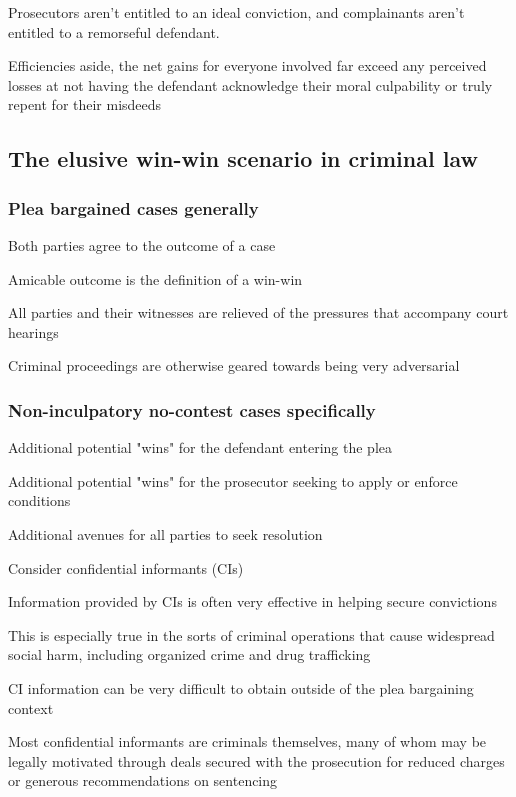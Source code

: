 Prosecutors aren't entitled to an ideal conviction, and complainants aren't entitled to a remorseful defendant. 

Efficiencies aside, the net gains for everyone involved far exceed any perceived losses at not having the defendant acknowledge their moral culpability or truly repent for their misdeeds

\subsection{The elusive win-win scenario in criminal law}

\subsubsection{Plea bargained cases generally}

Both parties agree to the outcome of a case

Amicable outcome is the definition of a win-win

All parties and their witnesses are relieved of the pressures that accompany court hearings

Criminal proceedings are otherwise geared towards being very adversarial

\subsubsection{Non-inculpatory no-contest cases specifically}

Additional potential "wins" for the defendant entering the plea

Additional potential "wins" for the prosecutor seeking to apply or enforce conditions

Additional avenues for all parties to seek resolution

Consider confidential informants (CIs)

Information provided by CIs is often very effective in helping secure convictions

This is especially true in the sorts of criminal operations that cause widespread social harm, including organized crime and drug trafficking

CI information can be very difficult to obtain outside of the plea bargaining context

Most confidential informants are criminals themselves, many of whom may be legally motivated through deals secured with the prosecution for reduced charges or generous recommendations on sentencing


